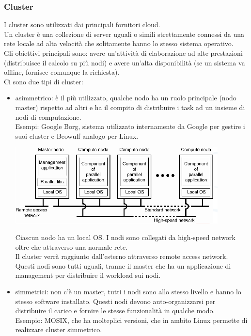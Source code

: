 \subsubsection{Cluster}
I cluster sono utilizzati dai principali fornitori cloud. \\
Un cluster è una collezione di server uguali o simili strettamente connessi da una rete locale ad alta velocità che solitamente hanno lo stesso sistema operativo.\\
Gli obiettivi principali sono: avere un'attività di elaborazione ad alte prestazioni (distribuisce il calcolo su più nodi) e avere un'alta disponibilità (se un sistema va offline, fornisce comunque la richiesta). \\
Ci sono due tipi di cluster:
\begin{itemize}
    \item asimmetrico: è il più utilizzato, qualche nodo ha un ruolo principale (nodo master) rispetto ad altri e ha il compito di distribuire i task ad un insieme di nodi di computazione. \\
    Esempi: Google Borg, sistema utilizzato internamente da Google per gestire i suoi cluster e Beowulf analogo per Linux.
    \begin{center}
    \includegraphics[width = .8\textwidth]{images/lezione1/ClusterAsimm.png}
    \end{center}
    Ciascun nodo ha un local OS. I nodi sono collegati da high-speed network oltre che attraverso una normale rete.\\Il cluster verrà raggiunto dall'esterno attraverso remote access network. \\Questi nodi sono tutti uguali, tranne il master che ha un applicazione di management per distribuire il workload sui nodi.
    \item simmetrici: non c'è un master, tutti i nodi sono allo stesso livello e hanno lo stesso software installato. Questi nodi devono auto-organizzarsi per distribuire il carico e fornire le stesse funzionalità in qualche modo.\\ Esempio: MOSIX, che ha molteplici versioni, che in ambito Linux permette di realizzare cluster simmetrico.
\end{itemize}


